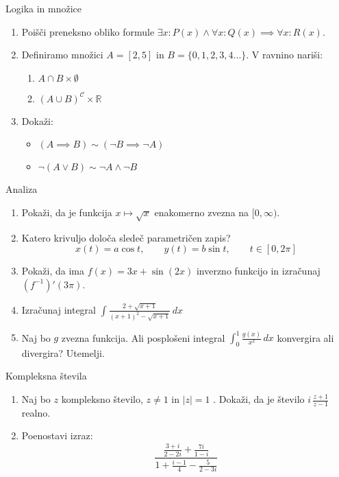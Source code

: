 \begin{frame}{Logika in množice}
	\begin{enumerate}
		\item
		Poišči preneksno obliko formule $\exists x : P(x) \land \forall x : Q(x) \implies \forall x : R(x)$.
		\item 
		Definiramo množici $A = [2,5]$  in $B = \{0,1,2,3,4...\} $.
		V ravnino nariši:
		\begin{enumerate}
		   \item $A \cap B \times \emptyset$
		   \item $(A \cup  B)^\mathcal{C} \times \mathbb{R}$ 
		\end{enumerate}
		\item
		Dokaži:
		\begin{itemize}
			\item $(A \implies B) \sim (\lnot B \implies \lnot A)$
			\item $\lnot(A \lor B) \sim \lnot A \land \lnot B$
		\end{itemize}
	\end{enumerate}
\end{frame}

\begin{frame}{Analiza}
	\begin{enumerate}
		\item
		Pokaži, da je funkcija $x \mapsto \sqrt{x}$ enakomerno zvezna na $[0,\infty )$.
		\item 
		Katero krivuljo določa sledeč parametričen zapis?
		$$
		   x(t) = a \cos t, \qquad %
		   y(t) = b \sin t, \qquad %
		   t \in [0, 2 \pi]
		$$ 
		\item
		Pokaži, da ima $f(x) = 3x + \sin(2x)$ inverzno funkcijo in izračunaj $(f^{-1})'(3\pi)$.
		
		\item
		Izračunaj integral 
		$\displaystyle \int \frac{2+\sqrt{x+1}}{(x+1)^2-\sqrt{x+1}} \,dx$
		\item 
		Naj bo $g$ zvezna funkcija. Ali posplošeni integral 
		$\int_{0}^{1} \frac{g(x)}{x^2} \,dx$
		konvergira ali divergira? Utemelji.
	\end{enumerate}
\end{frame}

\begin{frame}{Kompleksna števila}
	\begin{enumerate}
		\item
		Naj bo $z$ kompleksno število, $z \ne 1$ in $\left\lvert z \right\rvert = 1$ .
		Dokaži, da je število \( i \, \frac{z+1}{z-1} \) realno.
		\item
		Poenostavi izraz:
		$$\frac{\displaystyle\frac{3+i}{2-2i}+\frac{7i}{1-i}}{\displaystyle1+\frac{i-1}{4}-\frac{5}{2-3i}}$$
	\end{enumerate}
\end{frame}